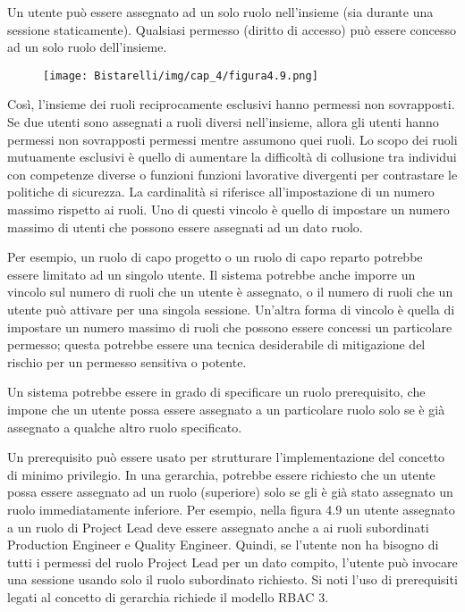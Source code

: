 \begin{center}
    Un utente può essere assegnato ad un solo ruolo nell'insieme (sia durante una sessione staticamente).
Qualsiasi permesso (diritto di accesso) può essere concesso ad un solo ruolo dell'insieme.
\end{center}

\begin{figure}[H]
	\centering
    \texttt{[image: Bistarelli/img/cap\_4/figura4.9.png]}
\end{figure}


\singlespacing

Così, l'insieme dei ruoli reciprocamente esclusivi hanno permessi non sovrapposti. Se due utenti sono assegnati a ruoli diversi nell'insieme, allora gli utenti hanno permessi non sovrapposti permessi mentre assumono quei ruoli. Lo scopo dei ruoli mutuamente esclusivi è quello di aumentare la difficoltà di collusione tra individui con competenze diverse o funzioni funzioni lavorative divergenti per contrastare le politiche di sicurezza. La cardinalità si riferisce all'impostazione di un numero massimo rispetto ai ruoli. Uno di questi vincolo è quello di impostare un numero massimo di utenti che possono essere assegnati ad un dato ruolo.

Per esempio, un ruolo di capo progetto o un ruolo di capo reparto potrebbe essere limitato ad un singolo utente. Il sistema potrebbe anche imporre un vincolo sul numero di ruoli che un utente è assegnato, o il numero di ruoli che un utente può attivare per una singola sessione. Un'altra forma di vincolo è quella di impostare un numero massimo di ruoli che possono essere concessi un particolare permesso; questa potrebbe essere una tecnica desiderabile di mitigazione del rischio per un permesso sensitiva o potente.

\singlespacing

Un sistema potrebbe essere in grado di specificare un ruolo prerequisito, che impone che un utente possa essere assegnato a un particolare ruolo solo se è già assegnato a qualche altro ruolo specificato.

\singlespacing

Un prerequisito può essere usato per strutturare l'implementazione del concetto di minimo privilegio. In una gerarchia, potrebbe essere richiesto che un utente possa essere assegnato ad un ruolo (superiore) solo se gli è già stato assegnato un ruolo immediatamente inferiore. Per esempio, nella figura 4.9 un utente assegnato a un ruolo di Project Lead deve essere assegnato anche a ai ruoli subordinati Production Engineer e Quality Engineer. Quindi, se l'utente non ha bisogno di tutti i permessi del ruolo Project Lead per un dato compito, l'utente può invocare una sessione usando solo il ruolo subordinato richiesto. Si noti l'uso di prerequisiti legati al concetto di gerarchia richiede il modello RBAC 3.
